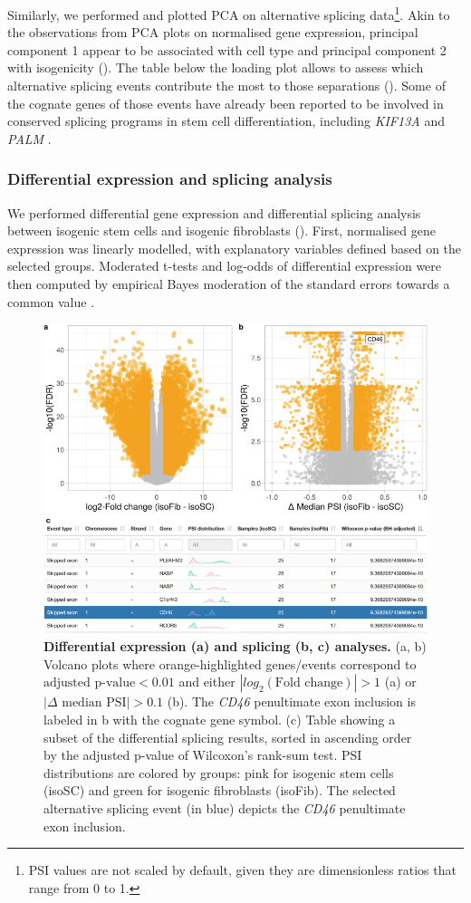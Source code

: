 Similarly, we performed and plotted PCA on alternative splicing data\footnote{PSI values are not scaled by default, given they are dimensionless ratios that range from 0 to 1.}. Akin to the observations from PCA plots on normalised gene expression, principal component 1 appear to be associated with cell type and principal component 2 with isogenicity (). The table below the loading plot allows to assess which alternative splicing events contribute the most to those separations (). Some of the cognate genes of those events have already been reported to be involved in conserved splicing programs in stem cell differentiation, including \emph{KIF13A} and \emph{PALM} \cite{venables:2013tz}.

\subsubsection{Differential expression and splicing analysis}

We performed differential gene expression and differential splicing analysis between isogenic stem cells and isogenic fibroblasts (). First, normalised gene expression was linearly modelled, with explanatory variables defined based on the selected groups. Moderated t-tests and log-odds of differential expression were then computed by empirical Bayes moderation of the standard errors towards a common value \cite{ritchie:2015tm}.

\begin{figure}[!ht]
  \includegraphics[width=.7\textwidth]{images/psichomics/6-diff-analyses}
  \centering
  \caption[Differential expression and splicing analyses]{\textbf{Differential expression (a) and splicing (b, c) analyses.} (a, b) Volcano plots where orange-highlighted genes/events correspond to $\textrm{adjusted p-value} < 0.01$ and either $|log_2(\textrm{Fold change})| > 1$ (a) or $|\Delta \textrm{ median PSI}| > 0.1$ (b). The \emph{CD46} penultimate exon inclusion is labeled in b with the cognate gene symbol. (c) Table showing a subset of the differential splicing results, sorted in ascending order by the adjusted p-value of Wilcoxon’s rank-sum test. PSI distributions are colored by groups: pink for isogenic stem cells (isoSC) and green for isogenic fibroblasts (isoFib). The selected alternative splicing event (in blue) depicts the \emph{CD46} penultimate exon inclusion.}
  \label{fig:psichomics-diff-analyses}
\end{figure}

